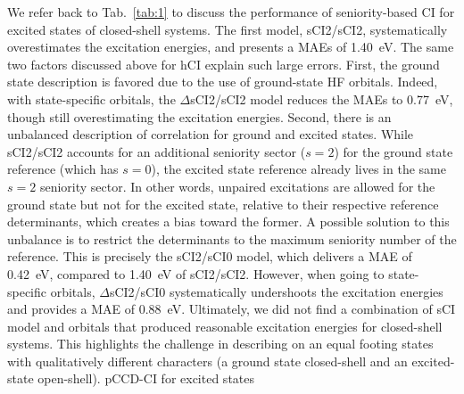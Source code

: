 \documentclass[aip,jcp,reprint,noshowkeys,superscriptaddress]{revtex4-1}
\begin{document}
We refer back to Tab.~\ref{tab:1} to discuss the performance of seniority-based CI for excited states of closed-shell systems.
The first model, sCI2/sCI2, systematically overestimates the excitation energies, and presents a MAEs of \SI{1.40}{\eV}.
The same two factors discussed above for hCI explain such large errors.
First, the ground state description is favored due to the use of ground-state HF orbitals.
Indeed, with state-specific orbitals, the $\Delta$sCI2/sCI2 model reduces the MAEs to \SI{0.77}{\eV}, though still overestimating the excitation energies.
Second, there is an unbalanced description of correlation for ground and excited states.
While sCI2/sCI2 accounts for an additional seniority sector ($s=2$) for the ground state reference (which has $s=0$), 
the excited state reference already lives in the same $s=2$ seniority sector.
In other words, unpaired excitations are allowed for the ground state but not for the excited state, relative to their respective reference determinants, which creates a bias toward the former.
A possible solution to this unbalance is to restrict the determinants to the maximum seniority number of the reference.
This is precisely the sCI2/sCI0 model, which delivers a MAE of \SI{0.42}{\eV}, compared to \SI{1.40}{\eV} of sCI2/sCI2.
However, when going to state-specific orbitals, $\Delta$sCI2/sCI0 systematically undershoots the excitation energies and provides a MAE of \SI{0.88}{\eV}.
Ultimately, we did not find a combination of sCI model and orbitals that produced reasonable excitation energies for closed-shell systems.
This highlights the challenge in describing on an equal footing states with qualitatively different characters (a ground state closed-shell and an excited-state open-shell).
pCCD-CI for excited states \cite{Nowak_2023}
\end{document}
